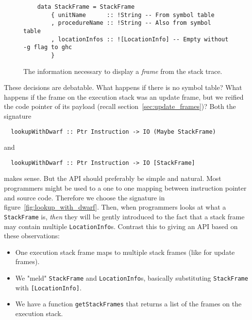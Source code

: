 \begin{figure}
\begin{mdframed}
  \begin{verbatim}
    data StackFrame = StackFrame
        { unitName      :: !String -- From symbol table
        , procedureName :: !String -- Also from symbol table
        , locationInfos :: ![LocationInfo] -- Empty without -g flag to ghc
        }
  \end{verbatim}
  \caption{The information necessary to display a \emph{frame} from the stack
    trace.}
  \label{fig:stack_frame}
\end{mdframed}
\end{figure}

These decisions are debatable. What happens if there is no symbol
table? What happens if the frame on the execution stack was an update
frame, but we reified the code pointer of its payload (recall section~\ref{sec:update_frames})? Both the signature

\begin{verbatim}
  lookupWithDwarf :: Ptr Instruction -> IO (Maybe StackFrame)
\end{verbatim}

and

\begin{verbatim}
  lookupWithDwarf :: Ptr Instruction -> IO [StackFrame]
\end{verbatim}

makes sense. But the API should preferably be simple and natural. Most
programmers might be used to a one to one mapping between instruction pointer
and source code. Therefore we choose the signature in figure~\ref{fig:lookup_with_dwarf}. Then, when programmers looks at what a
\texttt{StackFrame} is, \emph{then} they will be gently introduced to
the fact that a stack frame may contain multiple \texttt{LocationInfo}s.
Contrast this to giving an API based on these observations:

\begin{itemize}
  \item
    One execution stack frame maps to multiple stack frames (like for
    update frames).
  \item
    We "meld" \texttt{StackFrame} and \texttt{LocationInfo}s, basically
    substituting \texttt{StackFrame} with \texttt{[LocationInfo]}.
  \item
    We have a function \texttt{getStackFrames} that returns a list of the
    frames on the execution stack.
\end{itemize}

